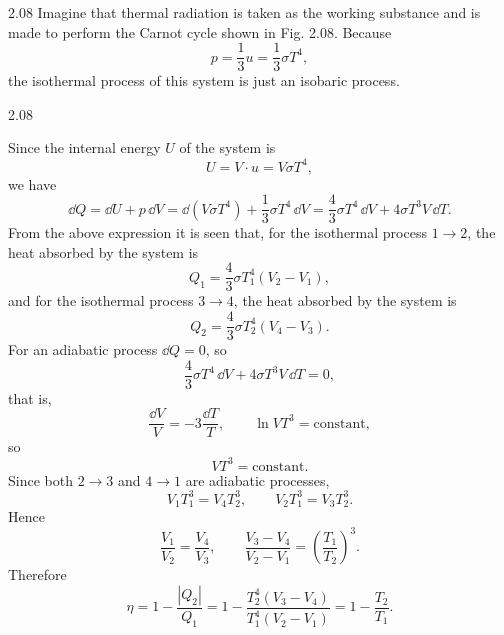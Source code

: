 \begin{solution}{2.08}
Imagine that thermal radiation is taken as the working substance and is made to perform the Carnot cycle shown in Fig. 2.08. Because
\[
p=\frac{1}{3}u=\frac{1}{3}\sigma T^4,
\]
the isothermal process of this system is just an isobaric process.

\begin{figbox}{2.08}
\end{figbox}

Since the internal energy $U$ of the system is
\[
U=V\cdot u=V\sigma T^4,
\]
we have
\[
\dd Q=\dd U+p\,\dd V=\dd(V\sigma T^4)+\frac{1}{3}\sigma T^4\,\dd V
=\frac{4}{3}\sigma T^4\,\dd V+4\sigma T^3V\,\dd T.
\]
From the above expression it is seen that, for the isothermal process $1\to2$, the heat absorbed by the system is
\[
Q_1=\frac{4}{3}\sigma T_1^4(V_2-V_1),
\]
and for the isothermal process $3\to4$, the heat absorbed by the system is
\[
Q_2=\frac{4}{3}\sigma T_2^4(V_4-V_3).
\]
For an adiabatic process $\dd Q=0$, so
\[
\frac{4}{3}\sigma T^4\,\dd V+4\sigma T^3V\,\dd T=0,
\]
that is,
\[
\frac{\dd V}{V}=-3\frac{\dd T}{T},\qquad \ln VT^3=\text{constant},
\]
so
\[
VT^3=\text{constant}.
\]
Since both $2\to3$ and $4\to1$ are adiabatic processes,
\[
V_1T_1^3=V_4T_2^3,\qquad V_2T_1^3=V_3T_2^3.
\]
Hence
\[
\frac{V_1}{V_2}=\frac{V_4}{V_3},
\qquad
\frac{V_3-V_4}{V_2-V_1}=\left(\frac{T_1}{T_2}\right)^3.
\]
Therefore
\[
\eta=1-\frac{|Q_2|}{Q_1}
=1-\frac{T_2^4(V_3-V_4)}{T_1^4(V_2-V_1)}
=1-\frac{T_2}{T_1}.
\]
\end{solution}

